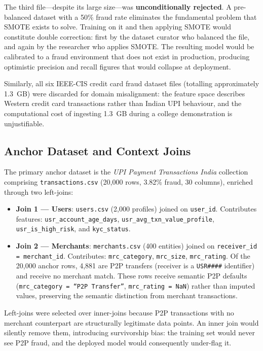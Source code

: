 \documentclass[conference]{IEEEtran}
\begin{document}
The third file---despite its large size---was \textbf{unconditionally
rejected}. A pre-balanced dataset with a 50\% fraud rate eliminates
the fundamental problem that SMOTE exists to solve. Training on it and
then applying SMOTE would constitute double correction: first by the
dataset curator who balanced the file, and again by the researcher who
applies SMOTE. The resulting model would be calibrated to a fraud
environment that does not exist in production, producing optimistic
precision and recall figures that would collapse at deployment.

Similarly, all six IEEE-CIS credit card fraud dataset files (totalling
approximately 1.3~GB) were discarded for domain misalignment: the feature
space describes Western credit card transactions rather than Indian UPI
behaviour, and the computational cost of ingesting 1.3~GB during a college
demonstration is unjustifiable.

\subsection{Anchor Dataset and Context Joins}

The primary anchor dataset is the \textit{UPI Payment Transactions India}
collection comprising \texttt{transactions.csv} (20{,}000 rows,
3.82\% fraud, 30 columns), enriched through two left-joins:

\begin{itemize}
    \item \textbf{Join 1 --- Users}: \texttt{users.csv} (2{,}000 profiles)
    joined on \texttt{user\_id}. Contributes features:
    \texttt{usr\_account\_age\_days}, \texttt{usr\_avg\_txn\_value\_profile},
    \texttt{usr\_is\_high\_risk}, and \texttt{kyc\_status}.

    \item \textbf{Join 2 --- Merchants}: \texttt{merchants.csv} (400 entities)
    joined on \texttt{receiver\_id = merchant\_id}. Contributes:
    \texttt{mrc\_category}, \texttt{mrc\_size}, \texttt{mrc\_rating}.
    Of the 20{,}000 anchor rows, 4{,}881 are P2P transfers (receiver is
    a \texttt{USR\#\#\#\#} identifier) and receive no merchant match.
    These rows receive semantic P2P defaults (\texttt{mrc\_category =
    ``P2P Transfer''}, \texttt{mrc\_rating = NaN}) rather than imputed
    values, preserving the semantic distinction from merchant transactions.
\end{itemize}

Left-joins were selected over inner-joins because P2P transactions with
no merchant counterpart are structurally legitimate data points. An inner
join would silently remove them, introducing survivorship bias: the training
set would never see P2P fraud, and the deployed model would consequently
under-flag it.
\end{document}
